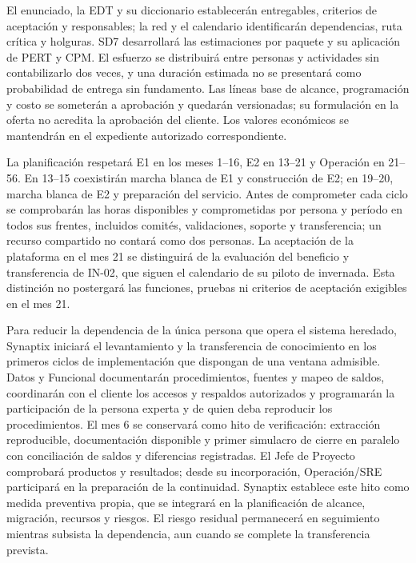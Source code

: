 El enunciado, la EDT y su diccionario establecerán entregables, criterios de aceptación y responsables; la red y el calendario identificarán dependencias, ruta crítica y holguras. SD7 desarrollará las estimaciones por paquete y su aplicación de PERT y CPM. El esfuerzo se distribuirá entre personas y actividades sin contabilizarlo dos veces, y una duración estimada no se presentará como probabilidad de entrega sin fundamento. Las líneas base de alcance, programación y costo se someterán a aprobación y quedarán versionadas; su formulación en la oferta no acredita la aprobación del cliente. Los valores económicos se mantendrán en el expediente autorizado correspondiente. \parencites[RT-19.03--05, p.~33]{sd6-bt}[arts.~50.2 y 72, pp.~29 y 38]{sd6-ba}

La planificación respetará E1 en los meses 1--16, E2 en 13--21 y Operación en 21--56. En 13--15 coexistirán marcha blanca de E1 y construcción de E2; en 19--20, marcha blanca de E2 y preparación del servicio. Antes de comprometer cada ciclo se comprobarán las horas disponibles y comprometidas por persona y período en todos sus frentes, incluidos comités, validaciones, soporte y transferencia; un recurso compartido no contará como dos personas. La aceptación de la plataforma en el mes 21 se distinguirá de la evaluación del beneficio y transferencia de IN-02, que siguen el calendario de su piloto de invernada. Esta distinción no postergará las funciones, pruebas ni criterios de aceptación exigibles en el mes 21. \parencite[sec.~3.1.2, pp.~7--11]{sd6-sd3}

Para reducir la dependencia de la única persona que opera el sistema heredado, Synaptix iniciará el levantamiento y la transferencia de conocimiento en los primeros ciclos de implementación que dispongan de una ventana admisible. Datos y Funcional documentarán procedimientos, fuentes y mapeo de saldos, coordinarán con el cliente los accesos y respaldos autorizados y programarán la participación de la persona experta y de quien deba reproducir los procedimientos. El mes 6 se conservará como hito de verificación: extracción reproducible, documentación disponible y primer simulacro de cierre en paralelo con conciliación de saldos y diferencias registradas. El Jefe de Proyecto comprobará productos y resultados; desde su incorporación, Operación/SRE participará en la preparación de la continuidad. Synaptix establece este hito como medida preventiva propia, que se integrará en la planificación de alcance, migración, recursos y riesgos. El riesgo residual permanecerá en seguimiento mientras subsista la dependencia, aun cuando se complete la transferencia prevista. \parencites[RT-05.15, p.~34]{sd6-c07}[sec.~3.1.2.1, p.~8]{sd6-sd3}

